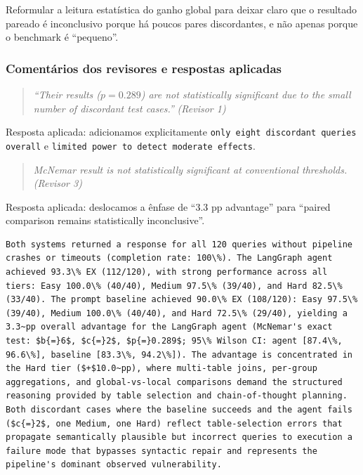 \documentclass[11pt,a4paper]{article}
\begin{document}
Reformular a leitura estatística do ganho global para deixar claro que o resultado pareado é inconclusivo porque há poucos pares discordantes, e não apenas porque o benchmark é ``pequeno''.

\subsubsection*{Comentários dos revisores e respostas aplicadas}

\begin{quote}
\textit{``Their results ($p{=}0.289$) are not statistically significant due to the small number of discordant test cases.''}
\hfill\textit{(Revisor 1)}
\end{quote}

\noindent Resposta aplicada: adicionamos explicitamente \texttt{only eight discordant queries overall} e \texttt{limited power to detect moderate effects}.

\begin{quote}
\textit{McNemar result is not statistically significant at conventional thresholds.}
\hfill\textit{(Revisor 3)}
\end{quote}

\noindent Resposta aplicada: deslocamos a ênfase de ``3.3 pp advantage'' para ``paired comparison remains statistically inconclusive''.

\begin{originalblock}
\begin{lstlisting}[style=texsnippet]
Both systems returned a response for all 120 queries without pipeline crashes or timeouts (completion rate: 100\%). The LangGraph agent achieved 93.3\% EX (112/120), with strong performance across all tiers: Easy 100.0\% (40/40), Medium 97.5\% (39/40), and Hard 82.5\% (33/40). The prompt baseline achieved 90.0\% EX (108/120): Easy 97.5\% (39/40), Medium 100.0\% (40/40), and Hard 72.5\% (29/40), yielding a 3.3~pp overall advantage for the LangGraph agent (McNemar's exact test: $b{=}6$, $c{=}2$, $p{=}0.289$; 95\% Wilson CI: agent [87.4\%, 96.6\%], baseline [83.3\%, 94.2\%]). The advantage is concentrated in the Hard tier ($+$10.0~pp), where multi-table joins, per-group aggregations, and global-vs-local comparisons demand the structured reasoning provided by table selection and chain-of-thought planning. Both discordant cases where the baseline succeeds and the agent fails ($c{=}2$, one Medium, one Hard) reflect table-selection errors that propagate semantically plausible but incorrect queries to execution a failure mode that bypasses syntactic repair and represents the pipeline's dominant observed vulnerability.
\end{lstlisting}
\end{originalblock}
\end{document}
